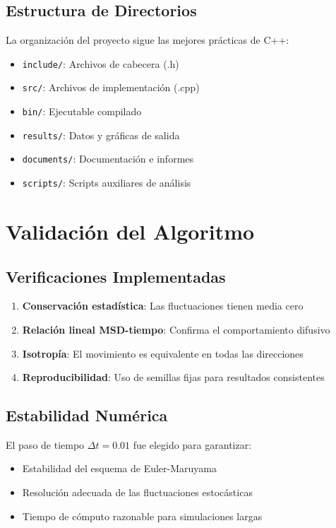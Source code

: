 \documentclass[11pt,a4paper]{article}
\begin{document}
\subsection{Estructura de Directorios}
La organización del proyecto sigue las mejores prácticas de C++:
\begin{itemize}
    \item \texttt{include/}: Archivos de cabecera (.h)
    \item \texttt{src/}: Archivos de implementación (.cpp)
    \item \texttt{bin/}: Ejecutable compilado
    \item \texttt{results/}: Datos y gráficas de salida
    \item \texttt{documents/}: Documentación e informes
    \item \texttt{scripts/}: Scripts auxiliares de análisis
\end{itemize}

\section{Validación del Algoritmo}

\subsection{Verificaciones Implementadas}
\begin{enumerate}
    \item \textbf{Conservación estadística}: Las fluctuaciones tienen media cero
    \item \textbf{Relación lineal MSD-tiempo}: Confirma el comportamiento difusivo
    \item \textbf{Isotropía}: El movimiento es equivalente en todas las direcciones
    \item \textbf{Reproducibilidad}: Uso de semillas fijas para resultados consistentes
\end{enumerate}

\subsection{Estabilidad Numérica}
El paso de tiempo $\Delta t = 0.01$ fue elegido para garantizar:
\begin{itemize}
    \item Estabilidad del esquema de Euler-Maruyama
    \item Resolución adecuada de las fluctuaciones estocásticas
    \item Tiempo de cómputo razonable para simulaciones largas
\end{itemize}
\end{document}
